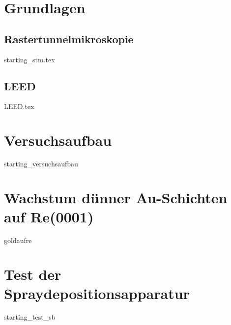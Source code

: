 \documentclass[a4paper,11pt,oneside,final,german,openbib,pdftex]{scrbook}
\begin{document}
\chapter{Grundlagen}


\section{Rastertunnelmikroskopie}
{starting_stm.tex}
 \section{LEED}
 {LEED.tex}


 \chapter{Versuchsaufbau} 
 {starting_versuchsaufbau}
 
\chapter{Wachstum dünner Au-Schichten auf Re(0001)}
{goldaufre}
 
\chapter{Test der Spraydepositionsapparatur} \label{kaptest}
{starting_test_sb}



% 
% 


% 
% 
% 
% 
\end{document}
